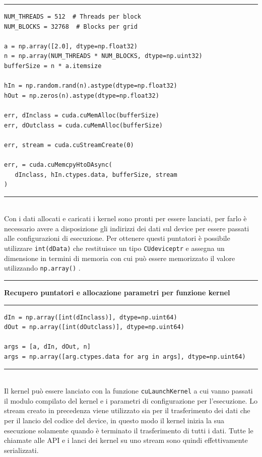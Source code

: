 \documentclass[12pt,a4paper]{report}
\begin{document}
\noindent\rule[0.5ex]{\linewidth}{1pt}
\begin{lstlisting}
NUM_THREADS = 512  # Threads per block
NUM_BLOCKS = 32768  # Blocks per grid

a = np.array([2.0], dtype=np.float32)
n = np.array(NUM_THREADS * NUM_BLOCKS, dtype=np.uint32)
bufferSize = n * a.itemsize

hIn = np.random.rand(n).astype(dtype=np.float32)
hOut = np.zeros(n).astype(dtype=np.float32)

err, dInclass = cuda.cuMemAlloc(bufferSize)
err, dOutclass = cuda.cuMemAlloc(bufferSize)

err, stream = cuda.cuStreamCreate(0)

err, = cuda.cuMemcpyHtoDAsync(
   dInclass, hIn.ctypes.data, bufferSize, stream
)

\end{lstlisting}
\noindent\rule[0.5ex]{\linewidth}{1pt} \\[10pt]
Con i dati allocati e caricati i kernel sono pronti per essere lanciati, per farlo è necessario avere a disposizione gli indirizzi dei dati sul device per essere passati alle configurazioni di esecuzione. Per ottenere questi puntatori è possibile utilizzare \verb|int(dData)| che restituisce un tipo \verb|CUdeviceptr| e assegna un dimensione in termini di memoria con cui può essere memorizzato il valore utilizzando \verb|np.array()| . \newpage

\noindent\rule[0.5ex]{\linewidth}{2pt}
\small{\textbf{Recupero puntatori e allocazione parametri per funzione kernel}} \\
\noindent\rule[0.5ex]{\linewidth}{1pt}
\begin{lstlisting}
dIn = np.array([int(dInclass)], dtype=np.uint64)
dOut = np.array([int(dOutclass)], dtype=np.uint64)

args = [a, dIn, dOut, n]
args = np.array([arg.ctypes.data for arg in args], dtype=np.uint64)
\end{lstlisting}
\noindent\rule[0.5ex]{\linewidth}{1pt} \\[10pt]
Il kernel può essere lanciato con la funzione \verb|cuLaunchKernel| a cui vanno passati il modulo compilato del kernel e i parametri di configurazione per l'esecuzione. Lo stream creato in precedenza viene utilizzato sia per il trasferimento dei dati che per il lancio del codice del device, in questo modo il kernel inizia la sua esecuzione solamente quando è terminato il trasferimento di tutti i dati. Tutte le chiamate alle API e i lanci dei kernel su uno stream sono quindi effettivamente serializzati.\newline
\end{document}
